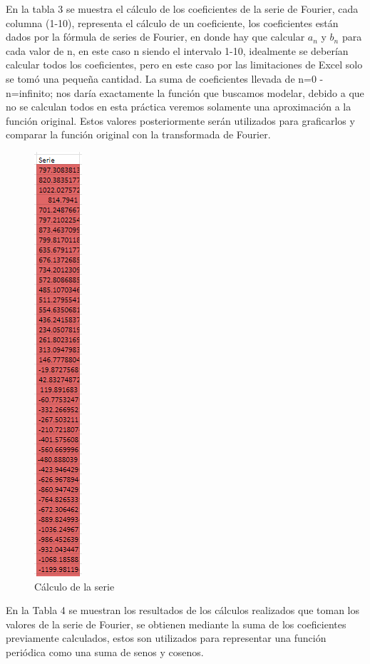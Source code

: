 En la tabla 3 se muestra el cálculo de los coeficientes de la serie de Fourier, cada columna (1-10), representa el cálculo de un coeficiente, los coeficientes están dados por la fórmula de series de Fourier, en donde hay que calcular \(a_n\) y \(b_n\) para cada valor de n, en este caso n siendo el intervalo 1-10, idealmente se deberían calcular todos los coeficientes, pero en este caso por las limitaciones de Excel solo se tomó una pequeña cantidad. La suma de coeficientes llevada de n=0 - n=infinito; nos daría exactamente la función que buscamos modelar, debido a que no se calculan todos en esta práctica veremos solamente una aproximación a la función original. Estos valores posteriormente serán utilizados para graficarlos y comparar la función original con la transformada de Fourier.

\begin{figure}[H]
    \centering
    \includegraphics[width=0.69792in,height=6.19792in]{media/image28.png}
    \caption{Cálculo de la serie}
\end{figure}
En la Tabla 4 se muestran los resultados de los cálculos realizados que toman los valores de la serie de Fourier, se obtienen mediante la suma de los coeficientes previamente calculados, estos son utilizados para representar una función periódica como una suma de senos y cosenos.

